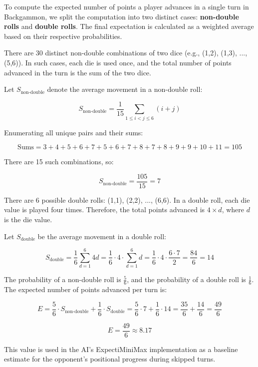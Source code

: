 To compute the expected number of points a player advances in a single turn in Backgammon, we split the computation into two distinct cases: \textbf{non-double rolls} and \textbf{double rolls}. The final expectation is calculated as a weighted average based on their respective probabilities.

There are \( 30 \) distinct non-double combinations of two dice (e.g., (1,2), (1,3), ..., (5,6)). In such cases, each die is used once, and the total number of points advanced in the turn is the sum of the two dice.

Let \( S_{\text{non-double}} \) denote the average movement in a non-double roll:

\[
S_{\text{non-double}} = \frac{1}{15} \sum_{1 \leq i < j \leq 6} (i + j)
\]

Enumerating all unique pairs and their sums:

\[
\text{Sums} = 3 + 4 + 5 + 6 + 7 + 5 + 6 + 7 + 8 + 7 + 8 + 9 + 9 + 10 + 11 = 105
\]

There are 15 such combinations, so:

\[
S_{\text{non-double}} = \frac{105}{15} = 7
\]

There are 6 possible double rolls: (1,1), (2,2), ..., (6,6). In a double roll, each die value is played four times. Therefore, the total points advanced is \( 4 \times d \), where \( d \) is the die value.

Let \( S_{\text{double}} \) be the average movement in a double roll:

\[
S_{\text{double}} = \frac{1}{6} \sum_{d=1}^{6} 4d = \frac{1}{6} \cdot 4 \cdot \sum_{d=1}^{6} d = \frac{1}{6} \cdot 4 \cdot \frac{6 \cdot 7}{2} = \frac{84}{6} = 14
\]

The probability of a non-double roll is \( \frac{5}{6} \), and the probability of a double roll is \( \frac{1}{6} \). The expected number of points advanced per turn is:

\[
E = \frac{5}{6} \cdot S_{\text{non-double}} + \frac{1}{6} \cdot S_{\text{double}} = \frac{5}{6} \cdot 7 + \frac{1}{6} \cdot 14 = \frac{35}{6} + \frac{14}{6} = \frac{49}{6}
\]

\[
E = \frac{49}{6} \approx 8.17
\]

This value is used in the AI's ExpectiMiniMax implementation as a baseline estimate for the opponent's positional progress during skipped turns.

